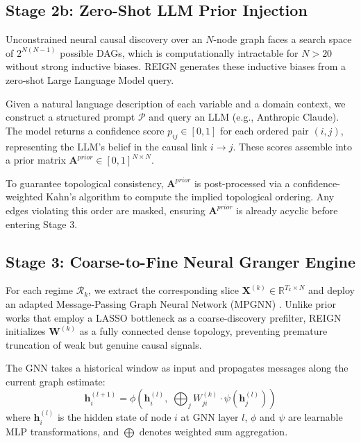 \subsection{Stage 2b: Zero-Shot LLM Prior Injection}

Unconstrained neural causal discovery over an $N$-node graph faces a search space of $2^{N(N-1)}$ possible DAGs, which is computationally intractable for $N > 20$ without strong inductive biases. REIGN generates these inductive biases from a zero-shot Large Language Model query.

Given a natural language description of each variable and a domain context, we construct a structured prompt $\mathcal{P}$ and query an LLM (e.g., Anthropic Claude). The model returns a confidence score $p_{ij} \in [0, 1]$ for each ordered pair $(i, j)$, representing the LLM's belief in the causal link $i \rightarrow j$. These scores assemble into a prior matrix $\mathbf{A}^{prior} \in [0,1]^{N \times N}$.

To guarantee topological consistency, $\mathbf{A}^{prior}$ is post-processed via a confidence-weighted Kahn's algorithm to compute the implied topological ordering. Any edges violating this order are masked, ensuring $\mathbf{A}^{prior}$ is already acyclic before entering Stage 3.

\subsection{Stage 3: Coarse-to-Fine Neural Granger Engine}

For each regime $\mathcal{R}_k$, we extract the corresponding slice $\mathbf{X}^{(k)} \in \mathbb{R}^{T_k \times N}$ and deploy an adapted Message-Passing Graph Neural Network (MPGNN) \cite{Cheng2024}. Unlike prior works that employ a LASSO bottleneck as a coarse-discovery prefilter, REIGN initializes $\mathbf{W}^{(k)}$ as a fully connected dense topology, preventing premature truncation of weak but genuine causal signals.

The GNN takes a historical window as input and propagates messages along the current graph estimate:
\begin{equation}
    \mathbf{h}_i^{(l+1)} = \phi\left(\mathbf{h}_i^{(l)},\; \bigoplus_{j} W^{(k)}_{ji} \cdot \psi\left(\mathbf{h}_j^{(l)}\right)\right)
\end{equation}
where $\mathbf{h}_i^{(l)}$ is the hidden state of node $i$ at GNN layer $l$, $\phi$ and $\psi$ are learnable MLP transformations, and $\bigoplus$ denotes weighted sum aggregation.

